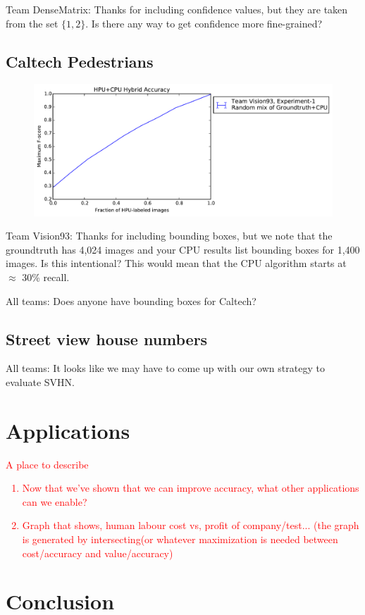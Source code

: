 \documentclass[10pt,twocolumn,letterpaper]{article}
\newcommand{\preliminary}[1]{\textcolor{red}{#1}}
\newcommand{\todo}{\colorbox{yellow}{\fbox{\LARGE{TODO}}}}
\begin{document}
\todo Team DenseMatrix: Thanks for including confidence values, but they are taken from the set $\{1, 2\}$. Is there any way to get confidence more fine-grained?

\subsection{Caltech Pedestrians}
\begin{figure}[t]
  \includegraphics[width=1\linewidth]{figure-Pedestrians-acc-vs-fraction.pdf}
\end{figure}

\todo Team Vision93: Thanks for including bounding boxes, but we note that the groundtruth has 4,024 images and your CPU results list bounding boxes for 1,400 images. Is this intentional? This would mean that the CPU algorithm starts at $\approx$ 30\% recall.

\todo All teams: Does anyone have bounding boxes for Caltech?


\subsection{Street view house numbers}
\todo All teams: It looks like we may have to come up with our own strategy to evaluate SVHN.


\section{Applications}
\preliminary{
A place to describe
\begin{enumerate}
\item Now that we've shown that we can improve accuracy, what other applications can we enable?
\item Graph that shows, human labour cost vs, profit of company/test... (the graph is generated by intersecting(or whatever maximization is needed between cost/accuracy and value/accuracy)
\end{enumerate}
}

\section{Conclusion}



{\small


}
\end{document}
